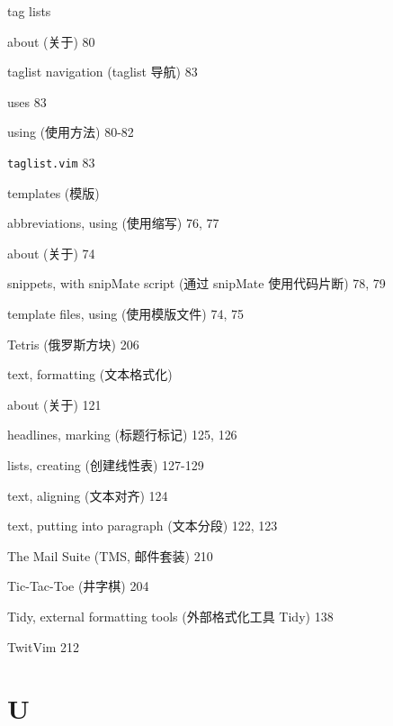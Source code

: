\begin{multicols}{2}
\hangindent=2pc  tag lists \par
\hangindent=2pc \quad about (关于) 80 \par
\hangindent=2pc \quad taglist navigation (taglist 导航) 83 \par
\hangindent=2pc \quad uses 83 \par
\hangindent=2pc \quad using (使用方法) 80-82 \par

\hangindent=2pc  \texttt{taglist.vim} 83

\hangindent=2pc  templates (模版) \par
\hangindent=2pc \quad abbreviations, using (使用缩写) 76, 77 \par
\hangindent=2pc \quad about (关于) 74 \par
\hangindent=2pc \quad snippets, with snipMate script (通过 snipMate 使用代码片断) 78, 79 \par
\hangindent=2pc \quad template files, using (使用模版文件) 74, 75 \par

\hangindent=2pc  Tetris (俄罗斯方块) 206

\hangindent=2pc  text, formatting (文本格式化) \par
\hangindent=2pc \quad about (关于) 121 \par
\hangindent=2pc \quad headlines, marking (标题行标记) 125, 126 \par
\hangindent=2pc \quad lists, creating (创建线性表) 127-129 \par
\hangindent=2pc \quad text, aligning (文本对齐) 124 \par
\hangindent=2pc \quad text, putting into paragraph (文本分段) 122, 123 \par

\hangindent=2pc  The Mail Suite (TMS, 邮件套装) 210

\hangindent=2pc  Tic-Tac-Toe (井字棋) 204

\hangindent=2pc  Tidy, external formatting tools (外部格式化工具 Tidy) 138

\hangindent=2pc  TwitVim 212

\hangindent=2pc  \section*{U}


\end{multicols}
